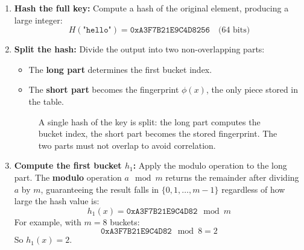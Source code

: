\begin{enumerate}
  \item \textbf{Hash the full key:} Compute a hash of the original 
        element, producing a large integer:
        \[
          H(\texttt{"hello"}) = \texttt{0xA3F7B21E9C4D8256} \quad \text{(64 bits)}
        \]
  
  \item \textbf{Split the hash:} Divide the output into two 
        non-overlapping parts:
        \begin{itemize}
          \item The \textbf{long part} determines the first bucket index.
          \item The \textbf{short part} becomes the fingerprint 
                $\phi(x)$, the only piece stored in the table.
        \end{itemize}
        
\begin{figure}[H]
  \centering
  \caption{A single hash of the key is split: the long part computes 
           the bucket index, the short part becomes the stored fingerprint.
           The two parts must not overlap to avoid correlation.}
  \label{fig:hash-split}
\end{figure}

  \item \textbf{Compute the first bucket $h_1$:} Apply the modulo 
        operation to the long part. The \textbf{modulo} operation 
        $a \mod m$ returns the remainder after dividing $a$ by $m$, 
        guaranteeing the result falls in $\{0, 1, \dots, m-1\}$ 
        regardless of how large the hash value is:
        \[
          h_1(x) = \texttt{0xA3F7B21E9C4D82} \mod m
        \]
        For example, with $m = 8$ buckets:
        \[
          \texttt{0xA3F7B21E9C4D82} \mod 8 = 2
        \]
        So $h_1(x) = 2$.


\end{enumerate}
